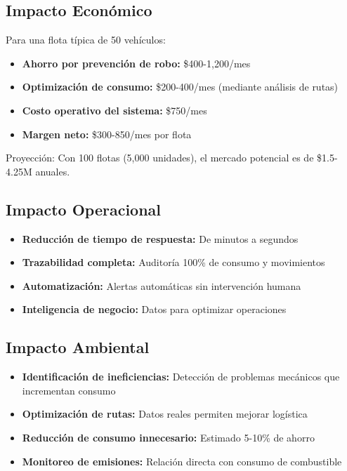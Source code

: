 \documentclass[12pt,a4paper,oneside]{report}
\begin{document}
\subsection{Impacto Económico}

Para una flota típica de 50 vehículos:

\begin{itemize}
    \item \textbf{Ahorro por prevención de robo:} \$400-1,200/mes
    \item \textbf{Optimización de consumo:} \$200-400/mes (mediante análisis de rutas)
    \item \textbf{Costo operativo del sistema:} \$750/mes
    \item \textbf{Margen neto:} \$300-850/mes por flota
\end{itemize}

Proyección: Con 100 flotas (5,000 unidades), el mercado potencial es de \$1.5-4.25M anuales.

\subsection{Impacto Operacional}

\begin{itemize}
    \item \textbf{Reducción de tiempo de respuesta:} De minutos a segundos
    \item \textbf{Trazabilidad completa:} Auditoría 100\% de consumo y movimientos
    \item \textbf{Automatización:} Alertas automáticas sin intervención humana
    \item \textbf{Inteligencia de negocio:} Datos para optimizar operaciones
\end{itemize}

\subsection{Impacto Ambiental}

\begin{itemize}
    \item \textbf{Identificación de ineficiencias:} Detección de problemas mecánicos que incrementan consumo
    \item \textbf{Optimización de rutas:} Datos reales permiten mejorar logística
    \item \textbf{Reducción de consumo innecesario:} Estimado 5-10\% de ahorro
    \item \textbf{Monitoreo de emisiones:} Relación directa con consumo de combustible
\end{itemize}
\end{document}
